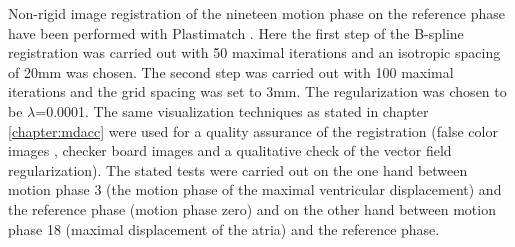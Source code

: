 Non-rigid image registration of the nineteen motion phase on the reference phase have been performed with Plastimatch \cite{Sharp07, Shack10}. 
Here the first step of the B-spline registration was carried out with 50 maximal iterations and an isotropic 
spacing of 20mm was chosen. The second step was carried out with 100 maximal iterations and the grid spacing was set to 3mm. 
The regularization was chosen to be $\lambda$=0.0001. The same visualization techniques as stated in chapter \ref{chapter:mdacc} were used for 
a quality assurance of the registration (false color images \cite{Bro07}, checker board images \cite{Bro07} and a qualitative check of the 
vector field regularization). The stated tests were carried out on the one hand between motion phase 3 (the motion phase of the 
maximal ventricular displacement) and the reference phase (motion phase zero) and on the other hand between motion 
phase 18 (maximal displacement of the atria) and the reference phase.  

\vspace*{-0.5cm}


